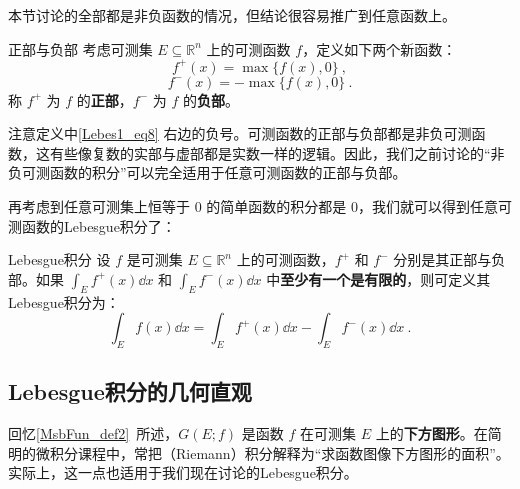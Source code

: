 本节讨论的全部都是非负函数的情况，但结论很容易推广到任意函数上。

\begin{definition}{正部与负部}
考虑可测集 $E\subseteq\mathbb{R}^n$ 上的可测函数 $f$，定义如下两个新函数：
\begin{equation}
f^+(x) = \max\{f(x), 0\}~,
\end{equation}
\begin{equation}\label{Lebes1_eq8}
f^-(x) = -\max\{f(x), 0\}~.
\end{equation}
称 $f^+$ 为 $f$ 的\textbf{正部}，$f^-$ 为 $f$ 的\textbf{负部}。

\end{definition}

注意定义中\autoref{Lebes1_eq8} 右边的负号。可测函数的正部与负部都是非负可测函数，这有些像复数的实部与虚部都是实数一样的逻辑。因此，我们之前讨论的“非负可测函数的积分”可以完全适用于任意可测函数的正部与负部。

再考虑到任意可测集上恒等于 $0$ 的简单函数的积分都是 $0$，我们就可以得到任意可测函数的Lebesgue积分了：

\begin{definition}{Lebesgue积分}\label{Lebes1_def1}
设 $f$ 是可测集 $E\subseteq\mathbb{R}^n$ 上的可测函数，$f^+$ 和 $f^-$ 分别是其正部与负部。如果 $\int_E f^+(x) \dd x$ 和 $\int_E f^-(x) \dd x$ 中\textbf{至少有一个是有限的}，则可定义其Lebesgue积分为：
\begin{equation}
\int_E f(x) \dd x = \int_E f^+(x) \dd x - \int_E f^-(x) \dd x~.
\end{equation}
\end{definition}














\subsection{Lebesgue积分的几何直观}


回忆\autoref{MsbFun_def2}~所述，$G(E; f)$ 是函数 $f$ 在可测集 $E$ 上的\textbf{下方图形}。在简明的微积分课程中，常把（Riemann）积分解释为“求函数图像下方图形的面积”。实际上，这一点也适用于我们现在讨论的Lebesgue积分。

